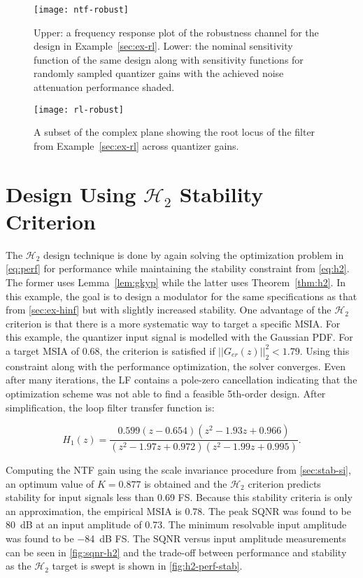 \begin{figure}
	\centering
	\texttt{[image: ntf-robust]}
	\caption{Upper: a frequency response plot of the robustness channel for the design in Example~\ref{sec:ex-rl}. Lower: the nominal sensitivity function of the same design along with sensitivity functions for randomly sampled quantizer gains with the achieved noise attenuation performance shaded.} \label{fig:ntf-rl}
\end{figure}

\begin{figure}
	\centering
	\texttt{[image: rl-robust]}
	\caption{A subset of the complex plane showing the root locus of the filter from Example~\ref{sec:ex-rl} across quantizer gains.} \label{fig:rl-rl}
\end{figure}

\section{Design Using $\mathcal{H}_2$ Stability Criterion}
\label{sec:ex-h2}

The $\mathcal{H}_2$ design technique is done by again solving the optimization problem in \autoref{eq:perf} for performance while maintaining the stability constraint from \autoref{eq:h2}. The former uses Lemma~\ref{lem:gkyp} while the latter uses Theorem~\ref{thm:h2}. In this example, the goal is to design a modulator for the same specifications as that from \autoref{sec:ex-hinf} but with slightly increased stability. One advantage of the $\mathcal{H}_2$ criterion is that there is a more systematic way to target a specific \gls{MSIA}. For this example, the quantizer input signal is modelled with the Gaussian \gls{PDF}. For a target \gls{MSIA} of 0.68, the criterion is satisfied if $||G_{er}(z)||^2_2<1.79$. Using this constraint along with the performance optimization, the solver converges. Even after many iterations, the \gls{LF} contains a pole-zero cancellation indicating that the optimization scheme was not able to find a feasible 5th-order design. After simplification, the loop filter transfer function is:

\begin{equation*}
	H_1(z) = \frac{0.599\left(z - 0.654\right)\left(z^2 - 1.93z + 0.966\right)}{\left(z^2 - 1.97z + 0.972\right)\left(z^2 - 1.99z + 0.995\right)}.
\end{equation*}

Computing the NTF gain using the scale invariance procedure from \autoref{sec:stab-si}, an optimum value of $K = 0.877$ is obtained and the $\mathcal{H}_2$ criterion predicts stability for input signals less than 0.69 \gls{FS}. Because this stability criteria is only an approximation, the empirical \gls{MSIA} is 0.78. The peak SQNR was found to be \SI{80}{\deci\bel} at an input amplitude of 0.73. The minimum resolvable input amplitude was found to be \SI{-84}{\deci\bel} \gls{FS}. The \gls{SQNR} versus input amplitude measurements can be seen in \autoref{fig:sqnr-h2} and the trade-off between performance and stability as the $\mathcal{H}_2$ target is swept is shown in \autoref{fig:h2-perf-stab}.

